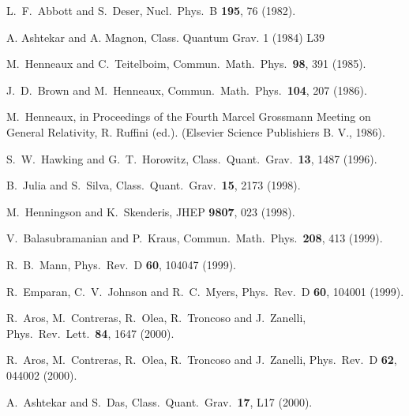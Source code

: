 \documentclass[a4paper,12pt]{article}
\begin{document}
\begin{thebibliography}{99}
  L.~F.~Abbott and S.~Deser, 
Nucl.\ Phys.\ B \textbf{195}, 76 (1982). 

  A. Ashtekar and A. Magnon, Class. Quantum Grav. 1
(1984) L39

  M.~Henneaux and C.~Teitelboim, 
Commun.\ Math.\ Phys.\ \textbf{98}, 391 (1985). 

  J.~D.~Brown and M.~Henneaux, 
Commun.\ Math.\ Phys.\ \textbf{104}, 207 (1986). 


  M.~Henneaux, 
in Proceedings of the Fourth Marcel Grossmann Meeting on General Relativity,
R. Ruffini (ed.). (Elsevier Science Publishiers B. V., 1986).


  S.~W.~Hawking and G.~T.~Horowitz, 
Class.\ Quant.\ Grav.\ \textbf{13}, 1487 (1996). 


  B.~Julia and S.~Silva, 
Class.\ Quant.\ Grav.\ \textbf{15}, 2173 (1998). 


M.~Henningson and K.~Skenderis,
JHEP {\bf 9807}, 023 (1998).




  V.~Balasubramanian and P.~Kraus, 
Commun.\ Math.\ Phys.\ \textbf{208}, 413 (1999). 


  R.~B.~Mann, %
Phys.\ Rev.\ D \textbf{60}, 104047 (1999). 


  R.~Emparan, C.~V.~Johnson and R.~C.~Myers, 
Phys.\ Rev.\ D \textbf{60}, 104001 (1999). 


  R.~Aros, M.~Contreras, R.~Olea, R.~Troncoso and
J.~Zanelli, 
Phys.\ Rev.\ Lett.\ \textbf{84}, 1647 (2000). 


  R.~Aros, M.~Contreras, R.~Olea, R.~Troncoso and
J.~Zanelli, 
Phys.\ Rev.\ D \textbf{62}, 044002 (2000). 


  A.~Ashtekar and S.~Das, 
Class.\ Quant.\ Grav.\ \textbf{17}, L17 (2000). 



\end{thebibliography}
\end{document}
